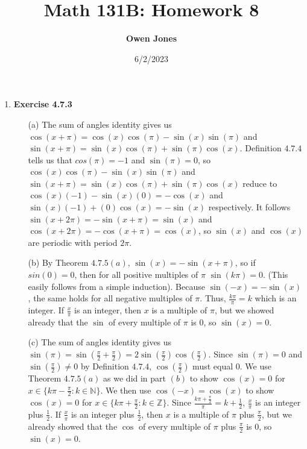 \documentclass[10pt]{article}
\title{\bf Math 131B: Homework 8}
\date{6/2/2023}
\author{\bf Owen Jones}
\begin{document}
\maketitle
\begin{enumerate}[label=Problem \arabic*.]
    \item \textbf{Exercise 4.7.3}
    \begin{itemize}
        \item [(a)] The sum of angles identity gives us $\cos(x+\pi)=\cos(x)\cos(\pi)-\sin(x)\sin(\pi)$ and $\sin(x+\pi)=\sin(x)\cos(\pi)+\sin(\pi)\cos(x)$. 
        Definition $4.7.4$ tells us that $cos(\pi)=-1$ and $\sin(\pi)=0$, so $\cos(x)\cos(\pi)-\sin(x)\sin(\pi)$ and $\sin(x+\pi)=\sin(x)\cos(\pi)+\sin(\pi)\cos(x)$ reduce to $\cos(x)(-1)-\sin(x)(0)=-\cos(x)$ and $\sin(x)(-1)+(0)\cos(x)=-\sin(x)$ respectively.
        It follows $\sin(x+2\pi)=-\sin(x+\pi)=\sin(x)$ and $\cos(x+2\pi)=-\cos(x+\pi)=\cos(x)$, so $\sin(x)$ and $\cos(x)$ are periodic with period $2\pi$.
        \item [(b)] By Theorem $4.7.5(a)$, $\sin(x)=-\sin(x+\pi)$, so if $sin(0)=0$, then for all positive multiples of $\pi$ $\sin(k\pi)=0$. 
        (This easily follows from a simple induction). Because $\sin(-x)=-\sin(x)$, the same holds for all negative multiples of $\pi$. Thus, $\frac{k\pi}{\pi}=k$ which is an integer.
        If $\frac{x}{\pi}$ is an integer, then $x$ is a multiple of $\pi$, but we showed already that the $\sin$ of every multiple of $\pi$ is $0$, so $\sin(x)=0$.
        \item [(c)] The sum of angles identity gives us $\sin(\pi)=\sin(\frac{\pi}{2}+\frac{\pi}{2})=2\sin(\frac{\pi}{2})\cos(\frac{\pi}{2})$. 
        Since $\sin(\pi)=0$ and $\sin(\frac{\pi}{2})\neq0$ by Definition $4.7.4$, $\cos(\frac{\pi}{2})$ must equal $0$. 
        We use Theorem $4.7.5(a)$ as we did in part $(b)$ to show $\cos(x)=0$ for $x\in\{k\pi-\frac{\pi}{2}:k\in\mathbb{N}\}$. 
        We then use $\cos(-x)=\cos(x)$ to show $\cos(x)=0$ for $x\in\{k\pi+\frac{\pi}{2}:k\in\mathbb{Z}\}$. Since $\frac{k\pi+\frac{\pi}{2}}{\pi}=k+\frac{1}{2}$, $\frac{x}{\pi}$ is an integer plus $\frac{1}{2}$. 
        If $\frac{x}{\pi}$ is an integer plus $\frac{1}{2}$, then $x$ is a multiple of $\pi$ plus $\frac{\pi}{2}$, but we already showed that the $\cos$ of every multiple of $\pi$ plus $\frac{\pi}{2}$ is $0$, so $\sin(x)=0$.\\
    \end{itemize}


\end{enumerate}
\end{document}
